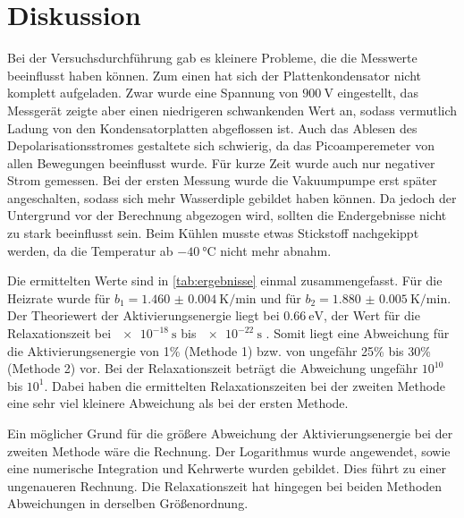 \section{Diskussion}
\label{sec:Diskussion}

Bei der Versuchsdurchführung gab es kleinere Probleme, die die Messwerte beeinflusst haben können.
Zum einen hat sich der Plattenkondensator nicht komplett aufgeladen.
Zwar wurde eine Spannung von $\SI{900}{\volt}$ eingestellt, das Messgerät zeigte aber einen niedrigeren schwankenden Wert an, sodass vermutlich Ladung 
von den Kondensatorplatten abgeflossen ist.
Auch das Ablesen des Depolarisationsstromes gestaltete sich schwierig, da das Picoamperemeter von allen Bewegungen beeinflusst wurde. 
Für kurze Zeit wurde auch nur negativer Strom gemessen.
Bei der ersten Messung wurde die Vakuumpumpe erst später angeschalten, sodass sich mehr Wasserdiple gebildet haben können. Da jedoch der Untergrund 
vor der Berechnung abgezogen wird, sollten die Endergebnisse nicht zu stark beeinflusst sein. 
Beim Kühlen musste etwas Stickstoff nachgekippt werden, da die Temperatur ab $\SI{-40}{\celsius}$ nicht mehr abnahm.

\noindent
Die ermittelten Werte sind in \autoref{tab:ergebnisse} einmal zusammengefasst.
Für die Heizrate wurde für $b_1 = \SI{1.460(4)}{\kelvin\per\minute}$ und für $b_2 = \SI{1.880(5)}{\kelvin\per\minute}$.
Der Theoriewert der Aktivierungsenergie liegt bei $\SI{0.66}{\electronvolt}$, der Wert für die Relaxationszeit bei $\SI{e-18}{\second}$ bis $\SI{e-22}{\second}$ \cite{muccillo}.
Somit liegt eine Abweichung für die Aktivierungsenergie von 1\% (Methode 1) bzw. von ungefähr 25\% bis 30\% (Methode 2) vor.
Bei der Relaxationszeit beträgt die Abweichung ungefähr $10^{10}$ bis $10^{1}$.
Dabei haben die ermittelten Relaxationszeiten bei der zweiten Methode eine sehr viel kleinere Abweichung als bei der ersten Methode.

\noindent
Ein möglicher Grund für die größere Abweichung der Aktivierungsenergie bei der zweiten Methode wäre die Rechnung.
Der Logarithmus wurde angewendet, sowie eine numerische Integration und Kehrwerte wurden gebildet.
Dies führt zu einer ungenaueren Rechnung.
Die Relaxationszeit hat hingegen bei beiden Methoden Abweichungen in derselben Größenordnung.

